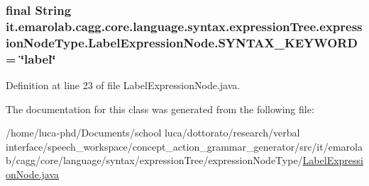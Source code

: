 \hypertarget{classit_1_1emarolab_1_1cagg_1_1core_1_1language_1_1syntax_1_1expressionTree_1_1expressionNodeType_1_1LabelExpressionNode_ab371494b9533af339e0fc22da6c51d50}{
\subsubsection[{S\-Y\-N\-T\-A\-X\-\_\-\-K\-E\-Y\-W\-O\-R\-D}]{\setlength{\rightskip}{0pt plus 5cm}final String it.\-emarolab.\-cagg.\-core.\-language.\-syntax.\-expression\-Tree.\-expression\-Node\-Type.\-Label\-Expression\-Node.\-S\-Y\-N\-T\-A\-X\-\_\-\-K\-E\-Y\-W\-O\-R\-D = \char`\"{}label\char`\"{}\hspace{0.3cm}{\ttfamily [static]}}}\label{classit_1_1emarolab_1_1cagg_1_1core_1_1language_1_1syntax_1_1expressionTree_1_1expressionNodeType_1_1LabelExpressionNode_ab371494b9533af339e0fc22da6c51d50}


Definition at line 23 of file Label\-Expression\-Node.\-java.



The documentation for this class was generated from the following file\-:\begin{DoxyCompactItemize}
\item 
/home/luca-\/phd/\-Documents/school luca/dottorato/research/verbal interface/speech\-\_\-workspace/concept\-\_\-action\-\_\-grammar\-\_\-generator/src/it/emarolab/cagg/core/language/syntax/expression\-Tree/expression\-Node\-Type/\hyperlink{LabelExpressionNode_8java}{Label\-Expression\-Node.\-java}\end{DoxyCompactItemize}
